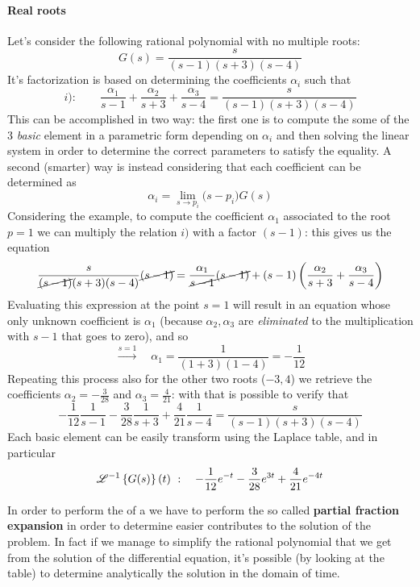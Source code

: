 	\paragraph{Real roots} Let's consider the following rational polynomial with no multiple roots:
	\[ G(s) = \frac{s}{(s-1)(s+3)(s-4)} \]
	It's factorization is based on determining the coefficients $\alpha_i$ such that
	\[ i): \qquad \frac{\alpha_1}{s-1} + \frac{\alpha_2}{s+3} + \frac{\alpha_3}{s-4} = \frac{s}{(s-1)(s+3)(s-4)} \]
	This can be accomplished in two way: the first one is to compute the some of the 3 \textit{basic} element in a parametric form depending on $\alpha_i$ and then solving the linear system in order to determine the correct parameters to satisfy the equality. A second (smarter) way is instead considering that each coefficient can be determined as
	\[ \alpha_i = \lim_{s\rightarrow p_i} \big(s-p_i\big) G(s) \]
	Considering the example, to compute the coefficient $\alpha_1$ associated to the root $p = 1$ we can multiply the relation $i)$ with a factor $(s-1)$: this gives us the equation
	\[ \frac{s}{\cancel{(s-1)}(s+3)(s-4)} \cancel{(s-1)}= \frac{\alpha_1}{\cancel{s-1}} \cancel{(s-1)} + {(s-1) \left( \frac{\alpha_2}{s+3} + \frac{\alpha_3}{s-4} \right)}  \]
	Evaluating this expression at the point $s=1$ will result in an equation whose only unknown coefficient is $\alpha_1$ (because $\alpha_2,\alpha_3$ are \textit{eliminated} to the multiplication with $s-1$ that goes to zero), and so
	\[\xrightarrow{s=1} \quad \alpha_1 = \frac{1}{(1+3)(1-4)} = -\frac 1 {12} \]
	Repeating this process also for the other two roots ($-3,4$) we retrieve the coefficients $\alpha_2 = -\frac 3 {28}$ and $\alpha_3 = \frac 4 {21}$: with that is possible to verify that
	\[ -\frac 1 {12} \frac 1 {s-1} - \frac 3 {28} \frac 1 {s+3} + \frac 4 {21} \frac{1}{s-4} = \frac{s}{(s-1)(s+3)(s-4)} \]
	Each basic element can be easily transform using the Laplace table, and in particular
	\[ \mathscr{L}^{-1} \left\{ G(s) \right\}(t) \ : \quad -\frac 1 {12} e^{-t} - \frac 3{28} e^{3t} + \frac 4 {21} e^{-4t} \]
	
	
	
	
	
	
	
	
	
	\vspace{3cm}


	In order to perform the  of a  we have to perform the so called \textbf{partial fraction expansion} in order to determine easier contributes to the solution of the problem. In fact if we manage to simplify the rational polynomial that we get from the solution of the differential equation, it's possible (by looking at the table) to determine analytically the solution in the domain of time.
	
